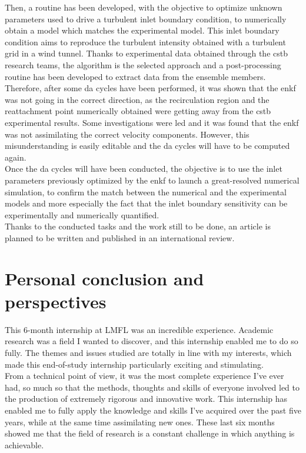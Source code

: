\documentclass[12pt,twoside]{report}
\begin{document}
\clearpage

Then, a  routine has been developed, with the objective to optimize unknown parameters used to drive a turbulent inlet boundary condition, to numerically obtain a model which matches the experimental model. This inlet boundary condition aims to reproduce the turbulent intensity obtained with a turbulent grid in a wind tunnel. Thanks to experimental data obtained through the \gls{cstb} research teams, the  algorithm is the selected approach and a post-processing routine has been developed to extract data from the ensemble members. Therefore, after some \gls{da} cycles have been performed, it was shown that the \gls{enkf} was not going in the correct direction, as the recirculation region and the reattachment point numerically obtained were getting away from the \gls{cstb} experimental results. Some investigations were led and it was found that the \gls{enkf} was not assimilating the correct velocity components. However, this misunderstanding is easily editable and the \gls{da} cycles will have to be computed again. \\

Once the \gls{da} cycles will have been conducted, the objective is to use the inlet parameters previously optimized by the \gls{enkf} to launch a great-resolved numerical simulation, to confirm the match between the numerical and the experimental models and more especially the fact that the inlet boundary sensitivity can be experimentally and numerically quantified. \\

Thanks to the conducted tasks and the work still to be done, an article is planned to be written and published in an international review. 


\section{Personal conclusion and perspectives}

This 6-month internship at LMFL was an incredible experience. Academic research was a field I wanted to discover, and this internship enabled me to do so fully. The themes and issues studied are totally in line with my interests, which made this end-of-study internship particularly exciting and stimulating. \\

From a technical point of view, it was the most complete experience I've ever had, so much so that the methods, thoughts and skills of everyone involved led to the production of extremely rigorous and innovative work. This internship has enabled me to fully apply the knowledge and skills I've acquired over the past five years, while at the same time assimilating new ones. These last six months showed me that the field of research is a constant challenge in which anything is achievable. \\
\end{document}
